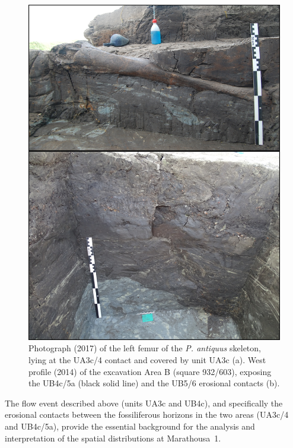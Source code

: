 \documentclass[preprint,authoryear,times]{elsarticle} %
\begin{document}
\begin{figure}[]
  \centering
  \includegraphics[width=1\textwidth]{./artwork/Fig4.png}
  \caption{Photograph (2017) of the left femur of the \emph{P. antiquus} skeleton, lying at the UA3c/4 contact and covered by unit UA3c (a). West profile (2014) of the excavation Area B (square 932/603), exposing the UB4c/5a (black solid line) and the UB5/6 erosional contacts (b).}
  \label{fig:4}
\end{figure}

The flow event described above (units UA3c and UB4c), and specifically the erosional contacts between the fossiliferous horizons in the two areas (UA3c/4 and UB4c/5a), provide the essential background for the analysis and interpretation of the spatial distributions at Marathousa~1.
\end{document}
